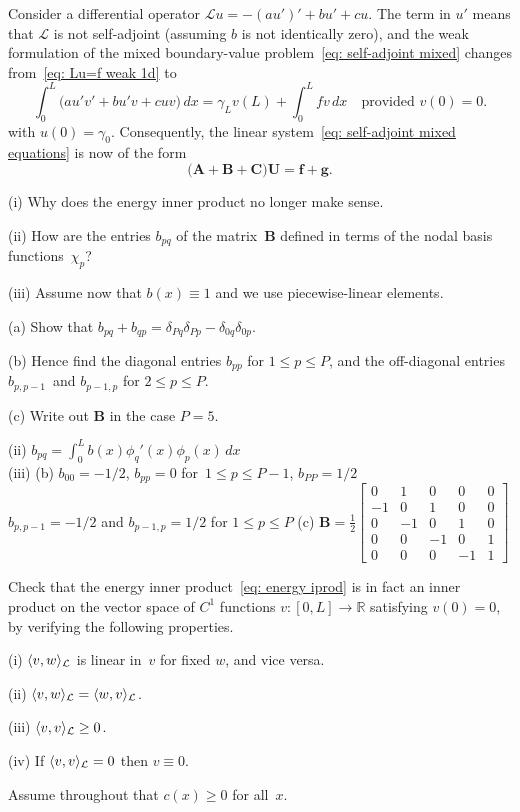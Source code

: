 \begin{Exercises}
\exercise
Consider a differential operator $\mathcal{L}u=-(au')'+bu'+cu$.  The term in 
$u'$ means that $\mathcal{L}$ is not self-adjoint (assuming $b$ is not 
identically zero), and the weak formulation of the mixed boundary-value 
problem~\eqref{eq: self-adjoint mixed} changes from~\eqref{eq: Lu=f weak 1d} to
\[
\int_0^L\bigl(au'v'+bu'v+cuv\bigr)\,dx
    =\gamma_Lv(L)+\int_0^Lfv\,dx\quad\text{provided $v(0)=0$.}
\]
with $u(0)=\gamma_0$. Consequently, the linear
system~\eqref{eq: self-adjoint mixed equations} is now of the form
\[
\bigl(\boldsymbol{A}+\boldsymbol{B}+\boldsymbol{C}\bigr)\boldsymbol{U}
    =\boldsymbol{f}+\boldsymbol{g}.
\]
\begin{description}
\item{(i)} Why does the energy inner product no longer make sense.
\item{(ii)} How are the entries $b_{pq}$ of the matrix~$\boldsymbol{B}$ defined 
in terms of the nodal basis functions~$\chi_p$?
\item{(iii)} Assume now that $b(x)\equiv1$ and we use piecewise-linear elements.
\begin{description}
\item{(a)} Show that 
$b_{pq}+b_{qp}=\delta_{Pq}\delta_{Pp}-\delta_{0q}\delta_{0p}$.
\item{(b)} Hence find the diagonal entries $b_{pp}$ for $1\le p\le P$, and
the off-diagonal entries $b_{p,p-1}$~and $b_{p-1,p}$ for $2\le p\le P$.
\item{(c)} Write out $\boldsymbol{B}$ in the case $P=5$.
\end{description}
\end{description}
\begin{ans}
(ii) $b_{pq}=\int_0^Lb(x)\phi_q'(x)\phi_p(x)\,dx$\\
(iii) (b) $b_{00}=-1/2$, $b_{pp}=0$ for~$1\le p\le P-1$, $b_{PP}=1/2$\\
$b_{p,p-1}=-1/2$ and $b_{p-1,p}=1/2$ for $1\le p\le P$
(c) $\boldsymbol{B}=\frac{1}{2}\begin{bmatrix}
 0& 1& 0& 0&0\\
-1& 0& 1& 0&0\\
 0&-1& 0& 1&0\\
 0& 0&-1& 0&1\\
 0& 0& 0&-1&1\end{bmatrix}$
\end{ans}


\exercise
Check that the energy inner product~\eqref{eq: energy iprod} is in fact an 
inner product on the vector space of $C^1$ functions $v:[0,L]\to\mathbb{R}$ 
satisfying $v(0)=0$, by verifying the following properties.
\begin{description}
\item{(i)} $\langle v,w\rangle_{\mathcal{L}}$ is linear in~$v$ for fixed $w$, and
vice versa.
\item{(ii)} $\langle v,w\rangle_{\mathcal{L}}=\langle w,v\rangle_{\mathcal{L}}$.
\item{(iii)} $\langle v,v\rangle_{\mathcal{L}}\ge0$.
\item{(iv)} If $\langle v,v\rangle_{\mathcal{L}}=0$ then $v\equiv0$.
\end{description}
Assume throughout that $c(x)\ge0$ for all~$x$.


\end{Exercises}
